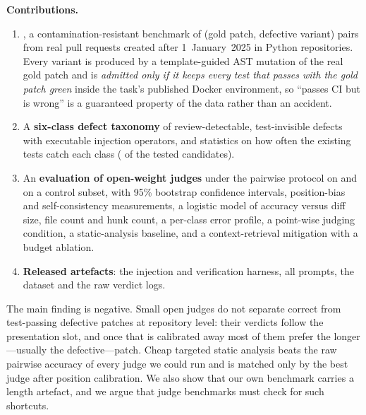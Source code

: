 \textbf{Contributions.}
\begin{enumerate}
\item \textbf{\RJB{}}, a contamination-resistant benchmark of
\NPairs{} (gold patch, defective variant) pairs from \NInstances{} real pull
requests created after 1~January~2025 in \NRepos{} Python repositories.  Every
variant is produced by a template-guided AST mutation of the real gold patch and
is \emph{admitted only if it keeps every test that passes with the gold patch
green} inside the task's published Docker environment, so ``passes CI but is
wrong'' is a guaranteed property of the data rather than an accident.
\item A \textbf{six-class defect taxonomy} of review-detectable, test-invisible
defects with executable injection operators, and statistics on how often the
existing tests catch each class (\TestCatchRate{} of the tested candidates).
\item An \textbf{evaluation of \NJudges{} open-weight judges} under the
\CJB{} pairwise protocol on \RJB{} and on a \CJB{} control subset, with 95\%
bootstrap confidence intervals, position-bias and self-consistency measurements,
a logistic model of accuracy versus diff size, file count and hunk count, a
per-class error profile, a point-wise judging condition, a static-analysis
baseline, and a context-retrieval mitigation with a budget ablation.
\item \textbf{Released artefacts}: the injection and verification harness, all
prompts, the dataset and the raw verdict logs.
\end{enumerate}

The main finding is negative.  Small open judges do not separate correct from
test-passing defective patches at repository level: their verdicts follow the
presentation slot, and once that is calibrated away most of them prefer the
longer---usually the defective---patch.  Cheap targeted static analysis beats the
raw pairwise accuracy of every judge we could run and is matched only by the
best judge after position calibration.  We also show that our own benchmark
carries a length artefact, and we argue that judge benchmarks must check for
such shortcuts.
